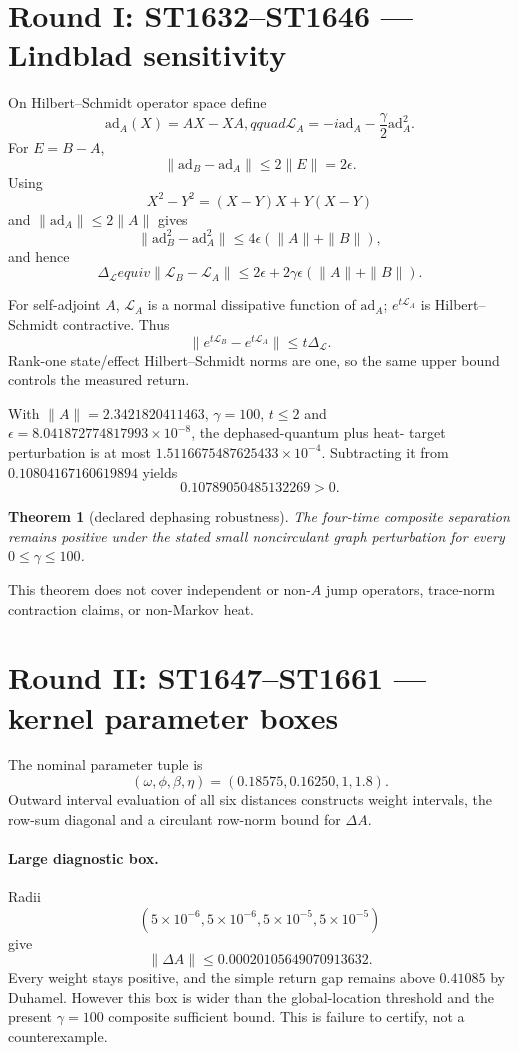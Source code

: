 \documentclass[11pt,a4paper]{article}
\newtheorem{theorem}{Theorem}\newcommand{\status}[1]{\textsf{[#1]}}
\begin{document}
\tableofcontents\newpage

\section{Round I: ST1632--ST1646 --- Lindblad sensitivity}

On Hilbert--Schmidt operator space define
\[
\mathrm{ad}_A(X)=AX-XA,qquad
\mathcal L_A=-i\mathrm{ad}_A-\frac{\gamma}{2}\mathrm{ad}_A^2.
\]
For $E=B-A$,
\[
\|\mathrm{ad}_B-\mathrm{ad}_A\|\le2\|E\|=2\epsilon.
\]
Using
\[
X^2-Y^2=(X-Y)X+Y(X-Y)
\]
and $\|\mathrm{ad}_A\|\le2\|A\|$ gives
\[
\|\mathrm{ad}_B^2-\mathrm{ad}_A^2\|
\le4\epsilon(\|A\|+\|B\|),
\]
and hence
\[
\Delta_{\mathcal L}equiv\|\mathcal L_B-\mathcal L_A\|
\le2\epsilon+2\gamma\epsilon(\|A\|+\|B\|).
\]

For self-adjoint $A$, $\mathcal L_A$ is a normal dissipative function of
$\mathrm{ad}_A$; $e^{t\mathcal L_A}$ is Hilbert--Schmidt contractive.  Thus
\[
\|e^{t\mathcal L_B}-e^{t\mathcal L_A}\|
\le t\Delta_{\mathcal L}.
\]
Rank-one state/effect Hilbert--Schmidt norms are one, so the same upper bound
controls the measured return.

With $\|A\|=2.3421820411463$, $\gamma=100$, $t\le2$ and
$\epsilon=8.041872774817993\times10^{-8}$, the dephased-quantum plus heat-
target perturbation is at most $1.5116675487625433\times10^{-4}$.  Subtracting
it from $0.10804167160619894$ yields
\[
0.10789050485132269>0.
\]

\begin{theorem}[declared dephasing robustness]
The four-time composite separation remains positive under the stated small
noncirculant graph perturbation for every $0\le\gamma\le100$.
\end{theorem}

This theorem does not cover independent or non-$A$ jump operators, trace-norm
contraction claims, or non-Markov heat.

\section{Round II: ST1647--ST1661 --- kernel parameter boxes}

The nominal parameter tuple is
\[
(\omega,\phi,\beta,\eta)=(0.18575,0.16250,1,1.8).
\]
Outward interval evaluation of all six distances constructs weight intervals,
the row-sum diagonal and a circulant row-norm bound for $\Delta A$.

\paragraph{Large diagnostic box.}
Radii
\[
(5\times10^{-6},5\times10^{-6},5\times10^{-5},5\times10^{-5})
\]
give
\[
\|\Delta A\|\le0.00020105649070913632.
\]
Every weight stays positive, and the simple return gap remains above $0.41085$
by Duhamel.  However this box is wider than the global-location threshold and
the present $\gamma=100$ composite sufficient bound.  This is failure to
certify, not a counterexample.
\end{document}
